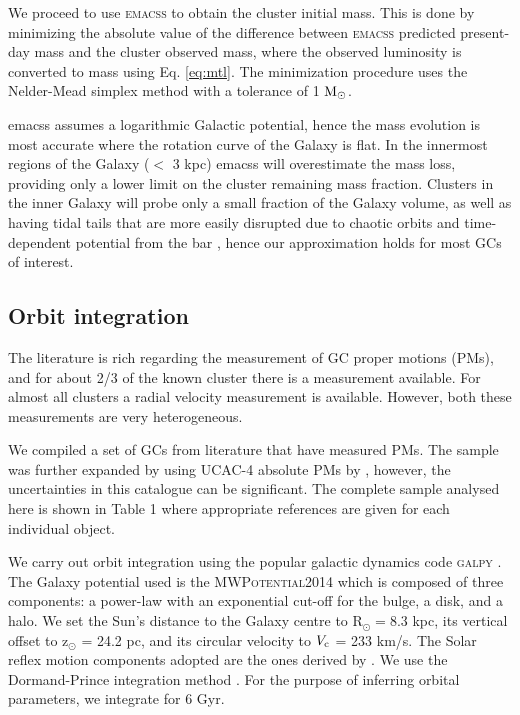 \documentclass[useAMS,usenatbib,fleqn]{mnras}
\newcommand{\msun}{{\rm M}_\odot}
\begin{document}
We proceed to use \textsc{emacss} to obtain the cluster initial mass. This is
done by minimizing the absolute value of the difference between \textsc{emacss}
predicted present-day mass and the cluster observed mass, where the observed
luminosity is converted to mass using Eq. \ref{eq:mtl}. The minimization
procedure uses the Nelder-Mead simplex method with a tolerance of 1 $\msun$. 

{\sc emacss} assumes a logarithmic Galactic potential, hence the mass evolution
is most accurate where the rotation curve of the Galaxy is flat. In the
innermost regions of the Galaxy ($<$ 3 kpc) {\sc emacss} will overestimate the
mass loss, providing only a lower limit on the cluster remaining mass fraction.
Clusters in the inner Galaxy will probe only a small fraction of the Galaxy
volume, as well as having tidal tails that are more easily disrupted due to
chaotic orbits and time-dependent potential from the bar \citep{APW16}, hence
our approximation holds for most GCs of interest.

\subsection{Orbit integration}
\label{sec:orbit}

The literature is rich regarding the measurement of GC proper motions (PMs), and
for about 2/3 of the known cluster there is a measurement available. For almost
all clusters a radial velocity measurement is available. However, both
these measurements are very heterogeneous.

We compiled a set of GCs from literature that have measured PMs.
The sample was further expanded by using UCAC-4 absolute PMs by
\citet{Dambis06}, however, the uncertainties in this catalogue can be
significant. The complete sample analysed here is shown in Table 1 where
appropriate references are given for each individual object.

We carry out orbit integration using the popular galactic dynamics code
\textsc{galpy} \citep{Bovy15}. The Galaxy potential used is the
\textsc{MWPotential2014} which is composed of three components: a power-law with
an exponential cut-off for the bulge, a \citet{MNdisk} disk, and a \citet*{NFW}
halo. We set the Sun's distance to the Galaxy centre to R$_{\odot}=8.3$ kpc, its
vertical offset to z$_{\odot}$ = 24.2 pc, and its circular velocity to $V_{\rm
c}$ = 233 km/s. The Solar reflex motion components adopted are the ones derived
by \citet{reflex}. We use the Dormand-Prince integration method \citep{DOPR}.
For the purpose of inferring orbital parameters, we integrate for 6 Gyr.
\end{document}
